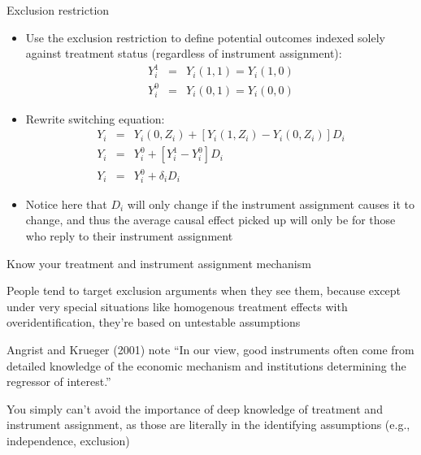 \documentclass{beamer}
\begin{document}
\begin{frame}{Exclusion restriction}
	
	\begin{itemize}
	\item Use the exclusion restriction to define potential outcomes indexed solely against treatment status (regardless of instrument assignment): 
		\begin{eqnarray*}
		 Y^1_{i} &=& Y_i(1,1) = Y_i(1,0) \\
		 Y^0_{i} &=& Y_i(0,1) = Y_i(0,0)
		\end{eqnarray*}
	\item Rewrite switching equation:
		\begin{eqnarray*}
		Y_i &=& Y_i(0,Z_i) + [Y_i(1,Z_i) - Y_i(0,Z_i)]D_i \\
		Y_i &=& Y^0_{i} + [Y^1_{i} - Y^0_{i}]D_i \\
		Y_i &=& Y^0_i + \delta_iD_i
		\end{eqnarray*}
	\item Notice here that $D_i$ will only change if the instrument assignment causes it to change, and thus the average causal effect picked up will only be for those who reply to their instrument assignment
	\end{itemize}

\end{frame}

\begin{frame}{Know your treatment and instrument assignment mechanism}

People tend to target exclusion arguments when they see them, because except under very special situations like homogenous treatment effects with overidentification, they're based on untestable assumptions

\bigskip

Angrist and Krueger (2001) note ``In our view, good instruments often come from detailed knowledge of the economic mechanism and institutions determining the regressor of interest.''  

\bigskip

You simply can't avoid the importance of deep knowledge of treatment and instrument assignment, as those are literally in the identifying assumptions (e.g., independence, exclusion)

\end{frame}
\end{document}
